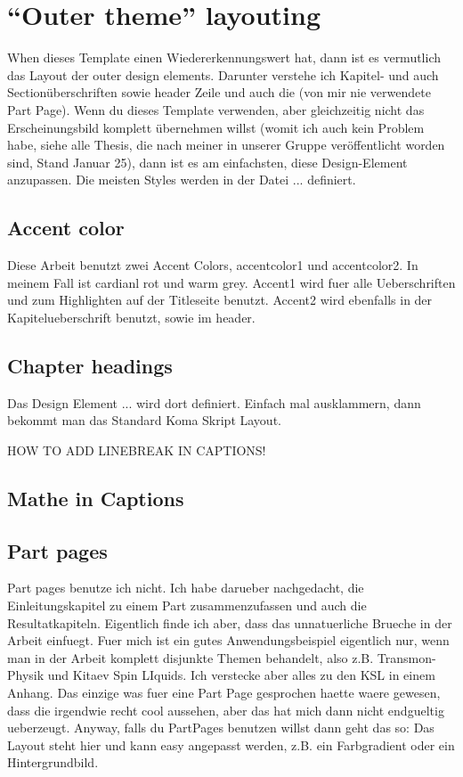 \section{``Outer theme'' layouting}

When dieses Template einen Wiedererkennungswert hat, dann ist es vermutlich das Layout der outer design elements. Darunter verstehe ich Kapitel- und auch Sectionüberschriften sowie header Zeile und auch die (von mir nie verwendete Part Page).
Wenn du dieses Template verwenden, aber gleichzeitig nicht das Erscheinungsbild komplett übernehmen willst (womit ich auch kein Problem habe, siehe alle Thesis, die nach meiner in unserer Gruppe veröffentlicht worden sind, Stand Januar 25), dann ist es am einfachsten, diese Design-Element anzupassen.
Die meisten Styles werden in der Datei ... definiert.


\subsection{Accent color}
Diese Arbeit benutzt zwei Accent Colors, accentcolor1 und accentcolor2.
In meinem Fall ist cardianl rot und warm grey.
Accent1 wird fuer alle Ueberschriften und zum Highlighten auf der Titleseite benutzt. Accent2 wird ebenfalls in der Kapitelueberschrift benutzt, sowie im header.

\subsection{Chapter headings}
Das Design Element ... wird dort definiert. Einfach mal ausklammern, dann bekommt man das Standard Koma Skript Layout.

HOW TO ADD LINEBREAK IN CAPTIONS!

\subsection{Mathe in Captions}

\subsection{Part pages}
Part pages benutze ich nicht. Ich habe darueber nachgedacht, die Einleitungskapitel zu einem Part zusammenzufassen und auch die Resultatkapiteln. Eigentlich finde ich aber, dass das unnatuerliche Brueche in der Arbeit einfuegt. Fuer mich ist ein gutes Anwendungsbeispiel eigentlich nur, wenn man in der Arbeit komplett disjunkte Themen behandelt, also z.B. Transmon-Physik und Kitaev Spin LIquids. Ich verstecke aber alles zu den KSL in einem Anhang. Das einzige was fuer eine Part Page gesprochen haette waere gewesen, dass die irgendwie recht cool aussehen, aber das hat mich dann nicht endgueltig ueberzeugt.
Anyway, falls du PartPages benutzen willst dann geht das so:
Das Layout steht hier und kann easy angepasst werden, z.B. ein Farbgradient oder ein Hintergrundbild.

